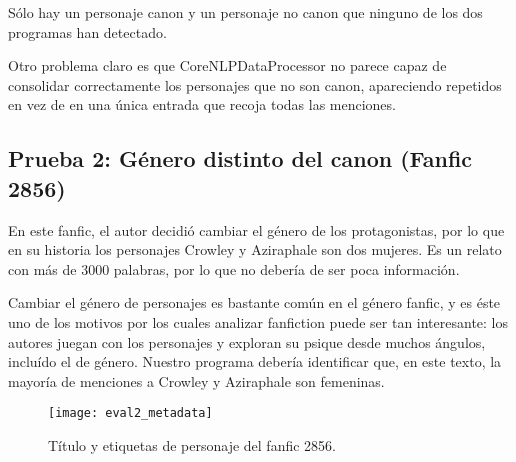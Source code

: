 \documentclass{pre-tfg}
\begin{document}
Sólo hay un personaje canon y un personaje no canon que ninguno de los dos programas han detectado.

Otro problema claro es que CoreNLPDataProcessor no parece capaz de consolidar correctamente los personajes que no son canon, apareciendo repetidos en vez de en una única entrada que recoja todas las menciones.


\subsection{Prueba 2: Género distinto del canon (Fanfic 2856)}
En este fanfic, el autor decidió cambiar el género de los protagonistas, por lo que en su historia los personajes Crowley y Aziraphale son dos mujeres. Es un relato con más de 3000 palabras, por lo que no debería de ser poca información.

Cambiar el género de personajes es bastante común en el género fanfic, y es éste uno de los motivos por los cuales analizar fanfiction puede ser tan interesante: los autores juegan con los personajes y exploran su psique desde muchos ángulos, incluído el de género. Nuestro programa debería identificar que, en este texto, la mayoría de menciones a Crowley y Aziraphale son femeninas.

\begin{figure}[h]
	\centering
	\label{fig:eval2_metadata}
	\texttt{[image: eval2\_metadata]}
	\caption{Título y etiquetas de personaje del fanfic 2856.}
\end{figure}
\end{document}
